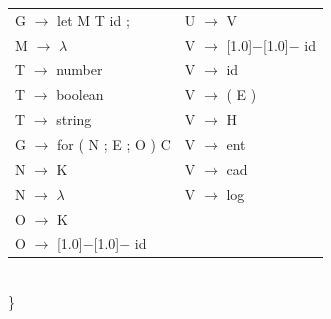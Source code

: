\documentclass[11pt, , a4paper, titlepage]{article}
\newcommand{\minus}{\scalebox{0.75}[1.0]{$-$}}
\begin{document}
\begin{tabular}{ l l }
    G $\rightarrow$ let M T id ;            & U $\rightarrow$ V                              \\
    M $\rightarrow$ $\lambda$               & V $\rightarrow$ \minus\minus \hspace{0.1cm} id \\
    T $\rightarrow$ number                  & V $\rightarrow$ id                             \\
    T $\rightarrow$ boolean                 & V $\rightarrow$ ( E )                          \\
    T $\rightarrow$ string                  & V $\rightarrow$ H                              \\
    G $\rightarrow$ for ( N ; E ; O ) { C } & V $\rightarrow$ ent                            \\
    N $\rightarrow$ K                       & V $\rightarrow$ cad                            \\
    N $\rightarrow$ $\lambda$               & V $\rightarrow$ log                            \\
    O $\rightarrow$ K                                                                        \\
    O $\rightarrow$ \minus\minus \hspace{0.1cm} id
\end{tabular}
\\\}
\clearpage
\end{document}
